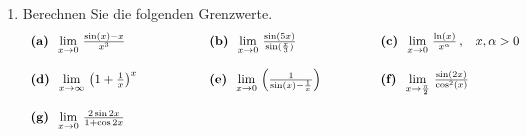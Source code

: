 \begin{ueb}
\begin{enumerate}
\begin{displaymath}
\begin{array}{lll}
				      \mbox{\bf (a)} \;\; \lim\limits_{x\searrow 0} \, x^x                                &
				      \mbox{\bf (b)} \;\; \lim\limits_{x\rightarrow 1} \Big(  \ln(x) \cdot \ln (1-x)\Big) &
				      \mbox{\bf (c)} \lim\limits_{x\rightarrow \infty} \, (x-\sqrt{(x-a)(x-b)}) \, , \hspace{0.3cm} a,b\in \mathbb{R} \\
				                                                                                          &   &                       \\
				      \mbox{\bf (d)} \;\; \lim\limits_{x\rightarrow \infty} \, x^{\frac{1}{x}}            &
				      \mbox{\bf (e)} \;\; \lim\limits_{x\rightarrow \infty} \, \frac{x\ln (x)}{x^2-1}     &
				      \mbox{\bf (f)} \;\; \lim\limits_{x\searrow 0} \, x^\alpha \cdot \ln (x) \, , \hspace{0.3cm} \alpha >0
			      \end{array}
		      \end{displaymath}
		\item Berechnen Sie die folgenden Grenzwerte.
		      \begin{displaymath}
			      \begin{array}{lll}
				      \mbox{\bf (a)} \;\; \lim\limits_{x\rightarrow 0} \, \frac{\sin (x)-x}{x^3} \hspace*{2cm}                     &
				      \mbox{\bf (b)} \;\; \lim\limits_{x\rightarrow 0} \, \frac{\sin(5x)}{\sin (\frac{x}{3})} \hspace*{2cm}        &
				      \mbox{\bf (c)} \;\; \lim\limits_{x\rightarrow 0} \, \frac{\ln (x)}{x^\alpha } \, , \hspace{0.3cm} x,\alpha >0      \\
				                                                                                                                   &   & \\
				      \mbox{\bf (d)} \;\; \lim\limits_{x\rightarrow \infty} \, \left( 1+\frac{1}{x}\right)^{x}                     &
				      \mbox{\bf (e)} \;\; \lim\limits_{x\rightarrow 0} \, \left( \frac{1}{\sin (x)-\frac{1}{x}} \right)            &
				      \mbox{\bf (f)} \;\; \lim\limits_{x\rightarrow \frac{\pi}{2}} \, \frac{\sin (2x)}{\cos^2 (x)}                       \\
				                                                                                                                   &   & \\
				      \mbox{\bf (g)} \;\; \lim\limits_{x\rightarrow 0} \, \frac{2\sin{2x}}{1+\cos {2x}}                            &

\end{array}
\end{displaymath}
\end{enumerate}
\end{ueb}
